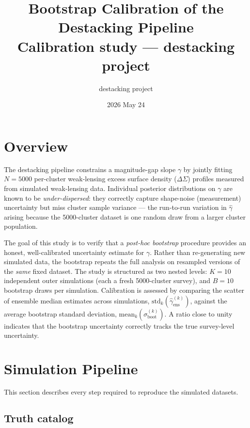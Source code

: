 \documentclass[11pt,a4paper]{article}
\title{\textbf{Bootstrap Calibration of the Destacking Pipeline}\\[0.4em]
\large Calibration study --- destacking project}
\author{destacking project}
\date{2026 May 24}
\begin{document}
\maketitle
\tableofcontents
\newpage

\section{Overview}

The destacking pipeline constrains a magnitude-gap slope $\gamma$ by jointly
fitting $N = 5000$ per-cluster weak-lensing excess surface density ($\Delta\Sigma$)
profiles measured from simulated weak-lensing data.  Individual posterior
distributions on $\gamma$ are known to be \emph{under-dispersed}: they correctly
capture shape-noise (measurement) uncertainty but miss cluster sample variance ---
the run-to-run variation in $\hat\gamma$ arising because the 5000-cluster dataset
is one random draw from a larger cluster population.

The goal of this study is to verify that a \emph{post-hoc bootstrap} procedure
provides an honest, well-calibrated uncertainty estimate for $\gamma$.  Rather
than re-generating new simulated data, the bootstrap repeats the full analysis on
resampled versions of the \emph{same} fixed dataset.  The study is structured as
two nested levels: $K = 10$ independent outer simulations (each a fresh 5000-cluster
survey), and $B = 10$ bootstrap draws per simulation.  Calibration is assessed by
comparing the scatter of ensemble median estimates across simulations,
$\mathrm{std}_k(\hat\gamma_\mathrm{ens}^{(k)})$, against the average bootstrap
standard deviation, $\mathrm{mean}_k(\sigma_\mathrm{boot}^{(k)})$.  A ratio close
to unity indicates that the bootstrap uncertainty correctly tracks the true
survey-level uncertainty.

\section{Simulation Pipeline}

This section describes every step required to reproduce the simulated datasets.

\subsection{Truth catalog}
\label{sec:truth}
\end{document}
